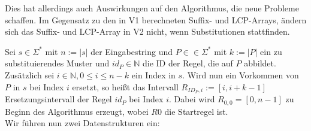 Dies hat allerdings auch Auswirkungen auf den Algorithmus, die neue Probleme schaffen. Im Gegensatz zu den in V1 berechneten Suffix- und LCP-Arrays, ändern sich das Suffix- und LCP-Array in V2 nicht, wenn Substitutionen stattfinden. 

Sei $s \in \Sigma^*$ mit $n := |s|$ der Eingabestring und $P \in \in \Sigma^*$ mit $k := |P|$  ein zu substituierendes Muster und $id_P \in \mathbb{N}$ die ID der Regel, die auf $P$ abbildet. Zusätzlich sei $i \in \mathbb{N}, 0 \leq i \leq n - k$ ein Index in $s$. Wird nun ein Vorkommen von $P$ in $s$ bei Index $i$ ersetzt, so heißt das Intervall $R_{ID_P, i} := [i, i + k - 1]$ Ersetzungsintervall der Regel $id_P$ bei Index $i$. Dabei wird $R_{0, 0} = [0, n-1]$ zu Beginn des Algorithmus erzeugt, wobei $R0$ die Startregel ist. \\
Wir führen nun zwei Datenstrukturen ein: 
